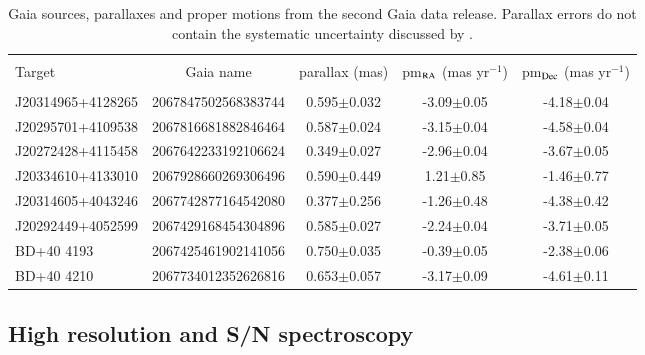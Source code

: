 \documentclass{aa} %
\begin{document}
\begin{table*}[t!]
	\centering
	\caption{Gaia sources, parallaxes and proper motions from the second Gaia data release. Parallax errors do not contain the systematic uncertainty discussed by \cite{arenou18,lindegren18,stassun18}.}
	\label{table_distances}
		\begin{tabular}{lcccc}
		\hline   
		\hline\\[-1.8ex]
    	\small{Target}& \small{Gaia name} & \small{parallax (mas)}& \small{pm$_{\rm RA}$ (mas yr$^{-1}$)}& \small{pm$_{\rm Dec}$ (mas yr$^{-1}$)}  \\
 \hline \\[-1.5ex]

\small{J20314965+4128265}& \small{2067847502568383744} & \small{ 0.595$\pm$0.032 } &\small{-3.09$\pm$0.05 } &\small{-4.18$\pm$0.04 } \\ 
\small{J20295701+4109538}& \small{2067816681882846464} & \small{0.587$\pm$0.024} &\small{-3.15$\pm$0.04 } & \small{-4.58$\pm$0.04} \\ 	
\small{J20272428+4115458}& \small{2067642233192106624} & \small{0.349$\pm$0.027} &\small{-2.96$\pm$0.04} &\small{-3.67$\pm$0.05}  \\
\small{J20334610+4133010}& \small{2067928660269306496}& \small{0.590$\pm$0.449} &\small{1.21$\pm$0.85} & \small{-1.46$\pm$0.77} \\
\small{J20314605+4043246}& \small{2067742877164542080} & \small{0.377$\pm$0.256} &\small{-1.26$\pm$0.48} & \small{-4.38$\pm$0.42}  \\  
\small{J20292449+4052599}& \small{2067429168454304896} & \small{0.585$\pm$0.027} &\small{-2.24$\pm$0.04} & \small{-3.71$\pm$0.05} \\   
\small{BD+40 4193}& \small{2067425461902141056}& \small{0.750$\pm$0.035} & \small{-0.39$\pm$0.05} &\small{-2.38$\pm$0.06}  \\ 
\small{BD+40 4210}& \small{2067734012352626816}& \small{0.653$\pm$0.057} &\small{-3.17$\pm$0.09} &\small{-4.61$\pm$0.11}  \\
\hline
		\end{tabular}
\end{table*}




\subsection{High resolution and S/N spectroscopy}\label{sect22}
\end{document}
